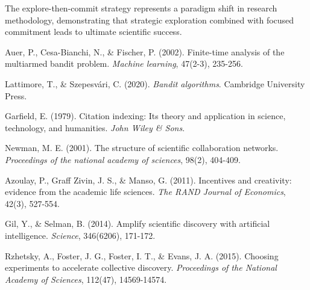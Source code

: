\documentclass[letterpaper]{article} %
\begin{document}
The explore-then-commit strategy represents a paradigm shift in research methodology, demonstrating that strategic exploration combined with focused commitment leads to ultimate scientific success.

\begin{thebibliography}{99}

 Auer, P., Cesa-Bianchi, N., \& Fischer, P. (2002). Finite-time analysis of the multiarmed bandit problem. \textit{Machine learning}, 47(2-3), 235-256.

 Lattimore, T., \& Szepesvári, C. (2020). \textit{Bandit algorithms}. Cambridge University Press.

 Garfield, E. (1979). Citation indexing: Its theory and application in science, technology, and humanities. \textit{John Wiley \& Sons}.

 Newman, M. E. (2001). The structure of scientific collaboration networks. \textit{Proceedings of the national academy of sciences}, 98(2), 404-409.

 Azoulay, P., Graff Zivin, J. S., \& Manso, G. (2011). Incentives and creativity: evidence from the academic life sciences. \textit{The RAND Journal of Economics}, 42(3), 527-554.

 Gil, Y., \& Selman, B. (2014). Amplify scientific discovery with artificial intelligence. \textit{Science}, 346(6206), 171-172.

 Rzhetsky, A., Foster, J. G., Foster, I. T., \& Evans, J. A. (2015). Choosing experiments to accelerate collective discovery. \textit{Proceedings of the National Academy of Sciences}, 112(47), 14569-14574.

\end{thebibliography}
\end{document}
